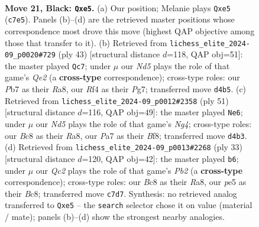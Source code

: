 \documentclass[11pt]{article}
\begin{document}
\clearpage

\begin{figure}[p]\centering
\begin{subfigure}{0.46\textwidth}\centering
\resizebox{\linewidth}{!}{%
\newchessgame
\chessboard[
  setfen={r1b2k2/ppq2pp1/n3p3/3pP3/3n1r2/PP1QN3/6PP/R2K2NR b - - 3 21},
  showmover=false,
  pgfstyle=straightmove, color=movearrow, markmove={c7-e5}
]}
\caption{}
\end{subfigure}\hfill
\begin{subfigure}{0.46\textwidth}\centering
\resizebox{\linewidth}{!}{%
\newchessgame
\chessboard[
  setfen={r5k1/p3qpp1/1pN1pn1p/6n1/1PN4Q/4PPP1/P5P1/3R2K1 b - - 2 22},
  showmover=false,
  pgfstyle=straightmove, color=movearrow, markmove={e7-c7}
]}
\caption{}
\end{subfigure}
\\[4pt]
\begin{subfigure}{0.46\textwidth}\centering
\resizebox{\linewidth}{!}{%
\newchessgame
\chessboard[
  setfen={r3kbr1/2q2p2/1pp2B1p/p4Nn1/P1P1P3/4Q1p1/2P3P1/3R1R1K b q - 0 26},
  showmover=false,
  pgfstyle=straightmove, color=movearrow, markmove={g5-e6}
]}
\caption{}
\end{subfigure}\hfill
\begin{subfigure}{0.46\textwidth}\centering
\resizebox{\linewidth}{!}{%
\newchessgame
\chessboard[
  setfen={r1b2k1r/ppq1pp1p/6p1/1BnRN3/8/4Q3/PPP2PPP/1K5R b - - 0 17},
  showmover=false,
  pgfstyle=straightmove, color=movearrow, markmove={b7-b6}
]}
\caption{}
\end{subfigure}
\caption{\textbf{Move 21, Black: \texttt{Qxe5}.} (a) Our position; Melanie plays \texttt{Qxe5} (\texttt{c7e5}). Panels (b)--(d) are the retrieved master positions whose correspondence most drove this move (highest QAP objective among those that transfer to it). (b) Retrieved from \texttt{lichess\_elite\_2024-09\_p0020\#729} (ply 43) [structural distance $d$=118, QAP obj=51]: the master played \texttt{Qc7}; under $\mu$ our \emph{Nd5} plays the role of that game's \emph{Qe2} (a \textbf{cross-type} correspondence); cross-type roles: our \emph{P}b7 as their \emph{R}a8, our \emph{R}f4 as their \emph{P}g7; transferred move \texttt{d4b5}. (c) Retrieved from \texttt{lichess\_elite\_2024-09\_p0012\#2358} (ply 51) [structural distance $d$=116, QAP obj=49]: the master played \texttt{Ne6}; under $\mu$ our \emph{Nd5} plays the role of that game's \emph{Ng4}; cross-type roles: our \emph{B}c8 as their \emph{R}a8, our \emph{P}a7 as their \emph{B}f8; transferred move \texttt{d4b3}. (d) Retrieved from \texttt{lichess\_elite\_2024-09\_p0013\#2268} (ply 33) [structural distance $d$=120, QAP obj=42]: the master played \texttt{b6}; under $\mu$ our \emph{Qc2} plays the role of that game's \emph{Pb2} (a \textbf{cross-type} correspondence); cross-type roles: our \emph{B}c8 as their \emph{R}a8, our \emph{p}e5 as their \emph{B}c8; transferred move \texttt{c7d7}. Synthesis: no retrieved analog transferred to \texttt{Qxe5} -- the \texttt{search} selector chose it on value (material / mate); panels (b)--(d) show the strongest nearby analogies.}
\label{fig:thought-m41}
\end{figure}
\end{document}
